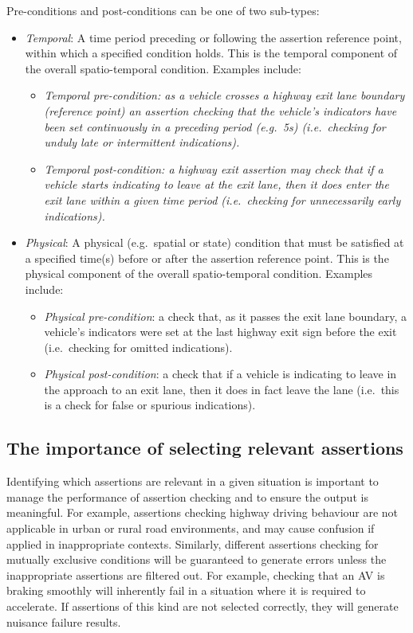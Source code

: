 Pre-conditions and post-conditions can be one of two sub-types:
\begin{itemize}
	\item \textit{Temporal}: A time period preceding or following the assertion reference point, within which a specified condition holds. This is the temporal component of the overall spatio-temporal condition. Examples include:
	\begin{itemize}
		\item \textit{Temporal pre-condition: as a vehicle crosses a highway exit lane boundary (reference point) an assertion checking that the vehicle's indicators have been set continuously in a preceding period (e.g.\ 5s) (i.e.\ checking for unduly late or intermittent indications).}
		\item\textit{Temporal post-condition: a highway exit assertion may check that if a vehicle starts indicating to leave at the exit lane, then it does enter the exit lane within a given time period (i.e.\ checking for unnecessarily early indications).}
	\end{itemize}
	
	\item \textit{Physical}: A physical (e.g.\ spatial or state) condition that must be satisfied at a specified time(s) before or after the assertion reference point. This is the physical component of the overall spatio-temporal condition. Examples include:
	\begin{itemize}
		\item \textit{Physical pre-condition}: a check that, as it passes the exit lane boundary, a vehicle's indicators were set at the last highway exit sign before the exit (i.e.\ checking for omitted indications).
		\item \textit{Physical post-condition}: a check that if a vehicle is indicating to leave in the approach to an exit lane, then it does in fact leave the lane (i.e.\ this is a check for false or spurious indications).
	\end{itemize} 
\end{itemize}

\subsection{The importance of selecting relevant assertions} \label{assertion_triggers}
Identifying which assertions are relevant in a given situation is important to manage the performance of assertion checking and to ensure the output is meaningful. For example, assertions checking highway driving behaviour are not applicable in urban or rural road environments, and may cause confusion if applied in inappropriate contexts. 
Similarly, different assertions checking for mutually exclusive conditions will be guaranteed to generate errors unless the inappropriate assertions are filtered out. For example, checking that an AV is braking smoothly will inherently fail in a situation where it is required to accelerate. If assertions of this kind are not selected correctly, they will generate nuisance failure results. 

